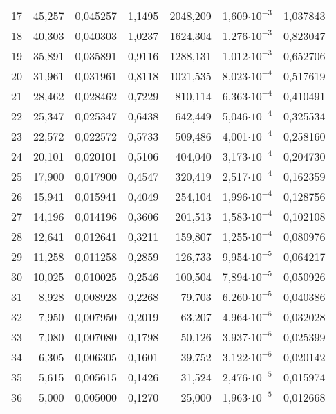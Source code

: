 \begin{longtable}{crrrrrr}
17 &     45,257 &   0,045257 &     1,1495 &   2048,209 &  1,609$\cdot 10^{-3}$ &   1,037843 \\
18 &     40,303 &   0,040303 &     1,0237 &   1624,304 &  1,276$\cdot 10^{-3}$ &   0,823047 \\
19 &     35,891 &   0,035891 &     0,9116 &   1288,131 &  1,012$\cdot 10^{-3}$ &   0,652706 \\
20 &     31,961 &   0,031961 &     0,8118 &   1021,535 &  8,023$\cdot 10^{-4}$ &   0,517619 \\
21 &     28,462 &   0,028462 &     0,7229 &    810,114 &  6,363$\cdot 10^{-4}$ &   0,410491 \\
22 &     25,347 &   0,025347 &     0,6438 &    642,449 &  5,046$\cdot 10^{-4}$ &   0,325534 \\
23 &     22,572 &   0,022572 &     0,5733 &    509,486 &  4,001$\cdot 10^{-4}$ &   0,258160 \\
24 &     20,101 &   0,020101 &     0,5106 &    404,040 &  3,173$\cdot 10^{-4}$ &   0,204730 \\
25 &     17,900 &   0,017900 &     0,4547 &    320,419 &  2,517$\cdot 10^{-4}$ &   0,162359 \\
26 &     15,941 &   0,015941 &     0,4049 &    254,104 &  1,996$\cdot 10^{-4}$ &   0,128756 \\
27 &     14,196 &   0,014196 &     0,3606 &    201,513 &  1,583$\cdot 10^{-4}$ &   0,102108 \\
28 &     12,641 &   0,012641 &     0,3211 &    159,807 &  1,255$\cdot 10^{-4}$ &   0,080976 \\
29 &     11,258 &   0,011258 &     0,2859 &    126,733 &  9,954$\cdot 10^{-5}$ &   0,064217 \\
30 &     10,025 &   0,010025 &     0,2546 &    100,504 &  7,894$\cdot 10^{-5}$ &   0,050926 \\
31 &      8,928 &   0,008928 &     0,2268 &     79,703 &  6,260$\cdot 10^{-5}$ &   0,040386 \\
32 &      7,950 &   0,007950 &     0,2019 &     63,207 &  4,964$\cdot 10^{-5}$ &   0,032028 \\
33 &      7,080 &   0,007080 &     0,1798 &     50,126 &  3,937$\cdot 10^{-5}$ &   0,025399 \\
34 &      6,305 &   0,006305 &     0,1601 &     39,752 &  3,122$\cdot 10^{-5}$ &   0,020142 \\
35 &      5,615 &   0,005615 &     0,1426 &     31,524 &  2,476$\cdot 10^{-5}$ &   0,015974 \\
36 &      5,000 &   0,005000 &     0,1270 &     25,000 &  1,963$\cdot 10^{-5}$ &   0,012668 \\

\end{longtable}
